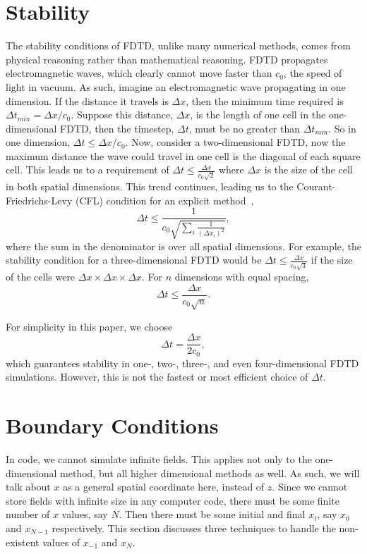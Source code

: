 \documentclass[12pt,twocolumn]{article}
\begin{document}
\section{Stability}
The stability conditions of FDTD, unlike many numerical methods, comes from physical reasoning rather than mathematical reasoning. FDTD propagates electromagnetic waves, which clearly cannot move faster than $c_0$, the speed of light in vacuum. As such, imagine an electromagnetic wave propagating in one dimension. If the distance it travels is $\Delta x$, then the minimum time required is $\Delta t_{\textit{min}} = \Delta x/c_0$. Suppose this distance, $\Delta x$, is the length of one cell in the one-dimensional FDTD, then the timestep, $\Delta t$, must be no greater than $\Delta t_\textit{min}$. So in one dimension, $\Delta t \leq \Delta x/c_0$. Now, consider a two-dimensional FDTD, now the maximum distance the wave could travel in one cell is the diagonal of each square cell. This leads us to a requirement of $\Delta t \leq \frac{\Delta x}{c_0\sqrt{2}}$ where $\Delta x$ is the size of the cell in both spatial dimensions. This trend continues, leading us to the Courant-Friedrichs-Levy (CFL) condition for an explicit method~\cite{Courant28},
\begin{equation}
\Delta t \leq \frac{1}{c_0\sqrt{\sum_i\frac{1}{(\Delta x_i)^2}}},
\end{equation}
where the sum in the denominator is over all spatial dimensions. For example, the stability condition for a three-dimensional FDTD would be $\Delta t \leq \frac{\Delta x}{c_0\sqrt{3}}$ if the size of the cells were $\Delta x \times \Delta x \times \Delta x$. For $n$ dimensions with equal spacing,
\begin{equation}
\Delta t \leq \frac{\Delta x}{c_0\sqrt{n}}.
\end{equation}

For simplicity in this paper, we choose
\begin{equation}
\Delta t = \frac{\Delta x}{2 c_0},
\end{equation}
which guarantees stability in one-, two-, three-, and even four-dimensional FDTD simulations. However, this is not the fastest or most efficient choice of $\Delta t$.

\section{Boundary Conditions}
In code, we cannot simulate infinite fields. This applies not only to the one-dimensional method, but all higher dimensional methods as well. As such, we will talk about $x$ as a general spatial coordinate here, instead of $z$. Since we cannot store fields with infinite size in any computer code, there must be some finite number of $x$ values, say $N$. Then there must be some initial and final $x_i$, say $x_0$ and $x_{N-1}$ respectively. This section discusses three techniques to handle the non-existent values of $x_{-1}$ and $x_{N}$.
\end{document}
